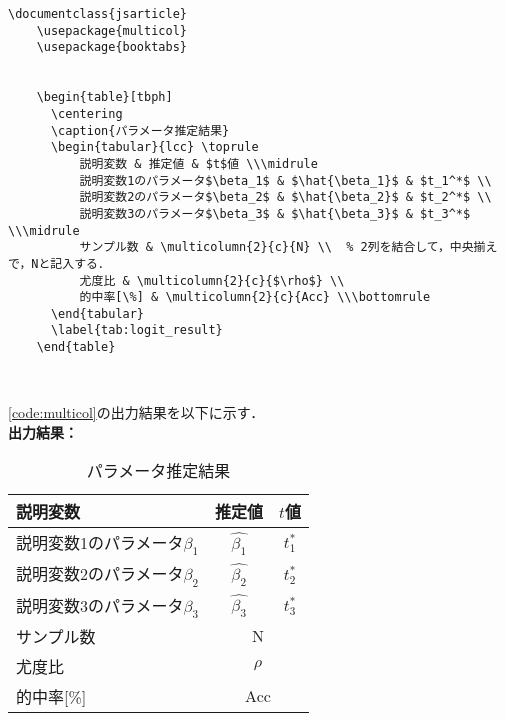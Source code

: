 \begin{lstlisting}[caption=列割りを変更した表,label=code:multicol]
    \documentclass{jsarticle}
    \usepackage{multicol}
    \usepackage{booktabs}
    
    
    \begin{table}[tbph]
      \centering
      \caption{パラメータ推定結果}
      \begin{tabular}{lcc} \toprule
          説明変数 & 推定値 & $t$値 \\\midrule
          説明変数1のパラメータ$\beta_1$ & $\hat{\beta_1}$ & $t_1^*$ \\
          説明変数2のパラメータ$\beta_2$ & $\hat{\beta_2}$ & $t_2^*$ \\
          説明変数3のパラメータ$\beta_3$ & $\hat{\beta_3}$ & $t_3^*$ \\\midrule
          サンプル数 & \multicolumn{2}{c}{N} \\  % 2列を結合して，中央揃えで，Nと記入する．
          尤度比 & \multicolumn{2}{c}{$\rho$} \\
          的中率[\%] & \multicolumn{2}{c}{Acc} \\\bottomrule
      \end{tabular}
      \label{tab:logit_result}
    \end{table}
    
    
\end{lstlisting}

\code\ref{code:multicol}の出力結果を以下に示す．\\
\noindent\textbf{出力結果：}\hrulefill\\
% 

\begin{table}[tbph]
  \centering
  \caption{パラメータ推定結果}
  \begin{tabular}{lcc} \toprule
      説明変数 & 推定値 & $t$値 \\\midrule
      説明変数1のパラメータ$\beta_1$ & $\hat{\beta_1}$ & $t_1^*$ \\
      説明変数2のパラメータ$\beta_2$ & $\hat{\beta_2}$ & $t_2^*$ \\
      説明変数3のパラメータ$\beta_3$ & $\hat{\beta_3}$ & $t_3^*$ \\\midrule
      サンプル数 & \multicolumn{2}{c}{N} \\
      尤度比 & \multicolumn{2}{c}{$\rho$} \\
      的中率[\%] & \multicolumn{2}{c}{Acc} \\\bottomrule
  \end{tabular}
  \label{tab:logit_result}
\end{table}

% 
\noindent\hrulefill  \\



